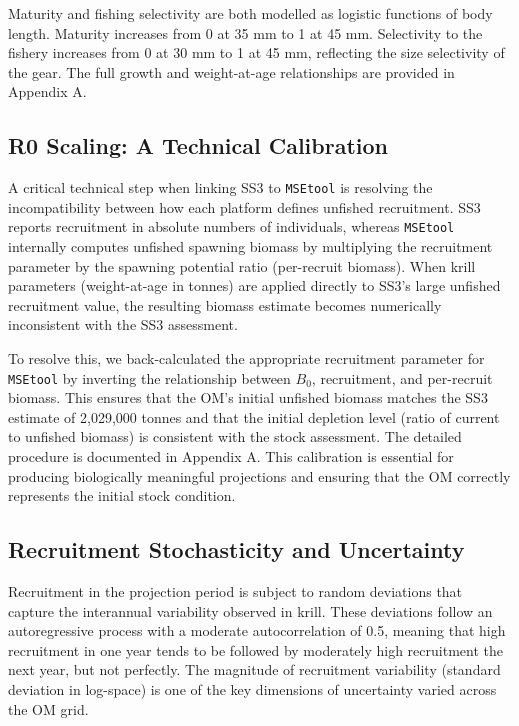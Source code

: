 \documentclass[
]{article}
\begin{document}
Maturity and fishing selectivity are both modelled as logistic functions of body length. Maturity increases from 0 at 35 mm to 1 at 45 mm. Selectivity to the fishery increases from 0 at 30 mm to 1 at 45 mm, reflecting the size selectivity of the gear. The full growth and weight-at-age relationships are provided in Appendix A.

\hypertarget{r0-scaling-a-technical-calibration}{%
\subsection{R0 Scaling: A Technical Calibration}\label{r0-scaling-a-technical-calibration}}

A critical technical step when linking SS3 to \texttt{MSEtool} is resolving the incompatibility between how each platform defines unfished recruitment. SS3 reports recruitment in absolute numbers of individuals, whereas \texttt{MSEtool} internally computes unfished spawning biomass by multiplying the recruitment parameter by the spawning potential ratio (per-recruit biomass). When krill parameters (weight-at-age in tonnes) are applied directly to SS3's large unfished recruitment value, the resulting biomass estimate becomes numerically inconsistent with the SS3 assessment.

To resolve this, we back-calculated the appropriate recruitment parameter for \texttt{MSEtool} by inverting the relationship between \(B_0\), recruitment, and per-recruit biomass. This ensures that the OM's initial unfished biomass matches the SS3 estimate of 2,029,000 tonnes and that the initial depletion level (ratio of current to unfished biomass) is consistent with the stock assessment. The detailed procedure is documented in Appendix A. This calibration is essential for producing biologically meaningful projections and ensuring that the OM correctly represents the initial stock condition.

\hypertarget{recruitment-stochasticity-and-uncertainty}{%
\subsection{Recruitment Stochasticity and Uncertainty}\label{recruitment-stochasticity-and-uncertainty}}

Recruitment in the projection period is subject to random deviations that capture the interannual variability observed in krill. These deviations follow an autoregressive process with a moderate autocorrelation of 0.5, meaning that high recruitment in one year tends to be followed by moderately high recruitment the next year, but not perfectly. The magnitude of recruitment variability (standard deviation in log-space) is one of the key dimensions of uncertainty varied across the OM grid.
\end{document}
